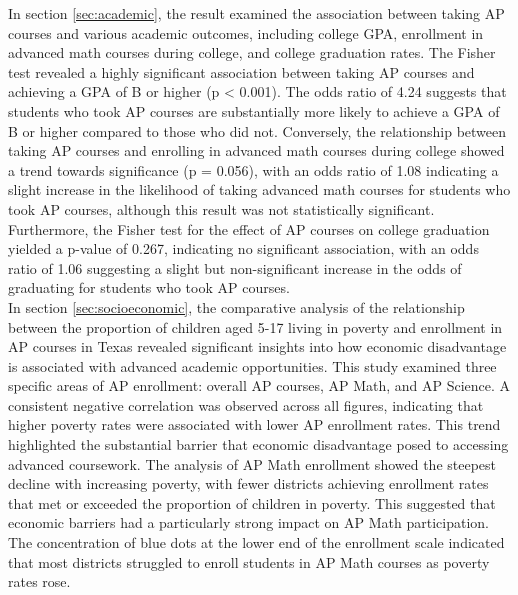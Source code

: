 \documentclass[sn-mathphys-num]{sn-jnl}%
\theoremstyle{thmstyleone}%
\theoremstyle{thmstyletwo}%
\theoremstyle{thmstylethree}%
\begin{document}
{In section \ref{sec:academic}, the result examined the association between taking AP courses and various academic outcomes, including college GPA, enrollment in advanced math courses during college, and college graduation rates. The Fisher test revealed a highly significant association between taking AP courses and achieving a GPA of B or higher (p < 0.001). The odds ratio of 4.24 suggests that students who took AP courses are substantially more likely to achieve a GPA of B or higher compared to those who did not. Conversely, the relationship between taking AP courses and enrolling in advanced math courses during college showed a trend towards significance (p = 0.056), with an odds ratio of 1.08 indicating a slight increase in the likelihood of taking advanced math courses for students who took AP courses, although this result was not statistically significant. Furthermore, the Fisher test for the effect of AP courses on college graduation yielded a p-value of 0.267, indicating no significant association, with an odds ratio of 1.06 suggesting a slight but non-significant increase in the odds of graduating for students who took AP courses.\\

In section \ref{sec:socioeconomic}, the comparative analysis of the relationship between the proportion of children aged 5-17 living in poverty and enrollment in AP courses in Texas revealed significant insights into how economic disadvantage is associated with advanced academic opportunities. This study examined three specific areas of AP enrollment: overall AP courses, AP Math, and AP Science. A consistent negative correlation was observed across all figures, indicating that higher poverty rates were associated with lower AP enrollment rates. This trend highlighted the substantial barrier that economic disadvantage posed to accessing advanced coursework. The analysis of AP Math enrollment showed the steepest decline with increasing poverty, with fewer districts achieving enrollment rates that met or exceeded the proportion of children in poverty. This suggested that economic barriers had a particularly strong impact on AP Math participation. The concentration of blue dots at the lower end of the enrollment scale indicated that most districts struggled to enroll students in AP Math courses as poverty rates rose.\\

}
\end{document}
